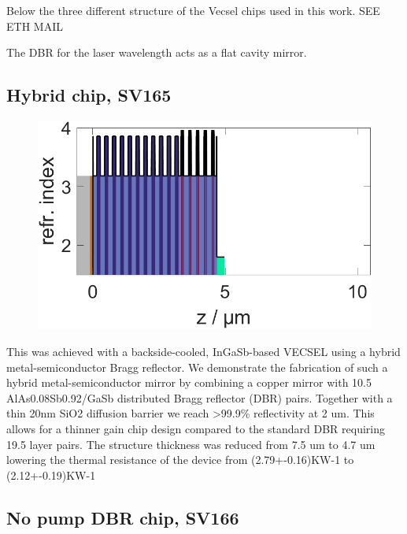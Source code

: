 Below the three different structure of the Vecsel chips used in this work.  SEE ETH MAIL

The DBR for the laser wavelength acts as a flat cavity mirror.


\subsection*{Hybrid chip, SV165}

\begin{figure}
    \centering
    \includegraphics[width=.98\textwidth]{images/1SV165.lay.png}
    \caption{}
    \label{fig:sv165}
\end{figure}

This was achieved with a backside-cooled, InGaSb-based VECSEL using a hybrid metal-semiconductor Bragg reflector. We demonstrate the fabrication of such a hybrid metal-semiconductor mirror by combining a copper mirror with 10.5 AlAs0.08Sb0.92/GaSb distributed Bragg reflector (DBR) pairs. Together with a thin 20nm SiO2 diffusion barrier we reach >99.9\% reflectivity at 2 um. This allows for a thinner gain chip design compared to the standard DBR requiring 19.5 layer pairs. The structure thickness was reduced from 7.5 um to 4.7 um lowering the thermal resistance of the device from (2.79+-0.16)KW-1 to (2.12+-0.19)KW-1


\subsection*{No pump DBR chip, SV166}

